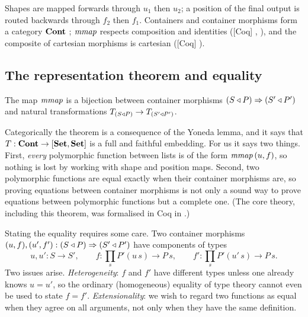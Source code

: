 \documentclass{fundam}
\begin{document}
Shapes are mapped forwards through $u_1$ then $u_2$; a position of the final output is
routed backwards through $f_2$ then $f_1$.  Containers and container morphisms form a
category $\mathbf{Cont}$ \cite{AbbottAltenkirchGhani05}; $\mathit{mmap}$ respects composition and
identities (\textsf{[Coq]} , ), and the composite of
cartesian morphisms is cartesian (\textsf{[Coq]} ).

\subsection{The representation theorem and equality}\label{sec:rep-eq}

\begin{theorem}\label{thm:rep}
  The map $\mathit{mmap}$ is a bijection between container morphisms
  $(S \triangleleft P) \Rightarrow (S' \triangleleft P')$ and natural transformations
  $T_{(S \triangleleft P)} \to T_{(S' \triangleleft P')}$.
\end{theorem}

Categorically the theorem is a consequence of the Yoneda lemma, and it says that
$T : \mathbf{Cont} \to [\mathbf{Set}, \mathbf{Set}]$ is a full and faithful embedding.  For us it says two things.
First, \emph{every} polymorphic function between lists is of the form
$\mathit{mmap}\,(u, f)$, so nothing is lost by working with shape and position maps.  Second,
two polymorphic functions are equal exactly when their container morphisms are, so
proving equations between container morphisms is not only a sound way to prove equations
between polymorphic functions but a complete one.
(The core theory, including this theorem, was formalised in Coq in \cite[Ch.~4]{Prince10}.)

Stating the equality requires some care.  Two container morphisms
$(u, f), (u', f') : (S \triangleleft P) \Rightarrow (S' \triangleleft P')$ have components of types
\[
  u, u' : S \to S', \qquad
  f : \textstyle\prod_s P'(u\,s) \to P\,s, \qquad
  f' : \textstyle\prod_s P'(u'\,s) \to P\,s .
\]
Two issues arise.  \emph{Heterogeneity}: $f$ and $f'$ have different types unless one
already knows $u = u'$, so the ordinary (homogeneous) equality of type theory cannot even
be used to state $f = f'$.  \emph{Extensionality}: we wish to regard two functions as
equal when they agree on all arguments, not only when they have the same definition.
\end{document}
